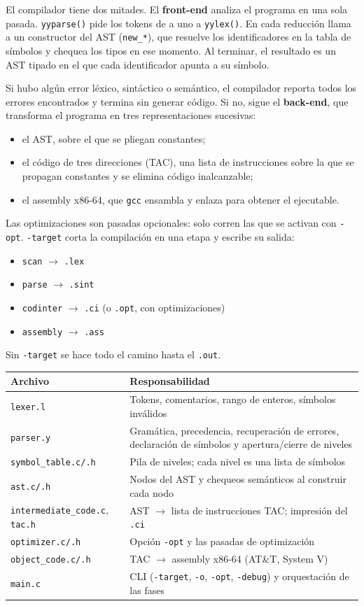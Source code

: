 \documentclass[11pt,a4paper]{article}
\newcommand{\code}[1]{\texttt{#1}}
\begin{document}
El compilador tiene dos mitades. El \textbf{front-end} analiza el programa en una sola pasada. \code{yyparse()} pide los tokens de a uno a \code{yylex()}. En cada reducción llama a un constructor del AST (\code{new\_*}), que resuelve los identificadores en la tabla de símbolos y chequea los tipos en ese momento. Al terminar, el resultado es un AST tipado en el que cada identificador apunta a su símbolo.

Si hubo algún error léxico, sintáctico o semántico, el compilador reporta todos los errores encontrados y termina sin generar código. Si no, sigue el \textbf{back-end}, que transforma el programa en tres representaciones sucesivas:
\begin{itemize}
  \item el AST, sobre el que se pliegan constantes;
  \item el código de tres direcciones (TAC), una lista de instrucciones sobre la que se propagan constantes y se elimina código inalcanzable;
  \item el assembly x86-64, que \code{gcc} ensambla y enlaza para obtener el ejecutable.
\end{itemize}

Las optimizaciones son pasadas opcionales: solo corren las que se activan con \code{-opt}. \code{-target} corta la compilación en una etapa y escribe su salida:
\begin{itemize}
  \item \code{scan} $\rightarrow$ \code{.lex}
  \item \code{parse} $\rightarrow$ \code{.sint}
  \item \code{codinter} $\rightarrow$ \code{.ci} (o \code{.opt}, con optimizaciones)
  \item \code{assembly} $\rightarrow$ \code{.ass}
\end{itemize}
Sin \code{-target} se hace todo el camino hasta el \code{.out}.

\begin{tabularx}{\textwidth}{P{4.3cm}L}
\toprule
\textbf{Archivo} & \textbf{Responsabilidad} \\
\midrule
\code{lexer.l} & Tokens, comentarios, rango de enteros, símbolos inválidos \\
\code{parser.y} & Gramática, precedencia, recuperación de errores, declaración de símbolos y apertura/cierre de niveles \\
\code{symbol\_table.c/.h} & Pila de niveles; cada nivel es una lista de símbolos \\
\code{ast.c/.h} & Nodos del AST y chequeos semánticos al construir cada nodo \\
\code{intermediate\_code.c}, \code{tac.h} & AST $\rightarrow$ lista de instrucciones TAC; impresión del \code{.ci} \\
\code{optimizer.c/.h} & Opción \code{-opt} y las pasadas de optimización \\
\code{object\_code.c/.h} & TAC $\rightarrow$ assembly x86-64 (AT\&T, System V) \\
\code{main.c} & CLI (\code{-target}, \code{-o}, \code{-opt}, \code{-debug}) y orquestación de las fases \\
\bottomrule
\end{tabularx}
\end{document}
